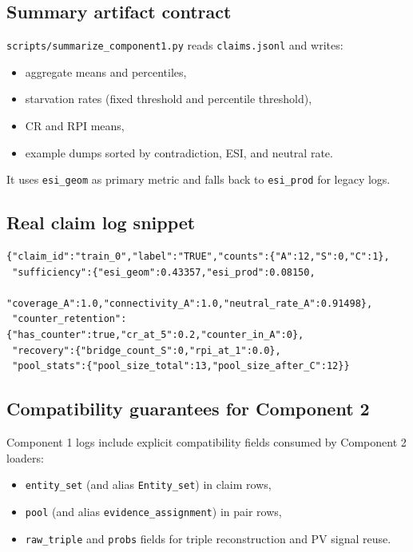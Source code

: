 \subsection{Summary artifact contract}
\texttt{scripts/summarize\_component1.py} reads \texttt{claims.jsonl} and writes:
\begin{itemize}
\item aggregate means and percentiles,
\item starvation rates (fixed threshold and percentile threshold),
\item CR and RPI means,
\item example dumps sorted by contradiction, ESI, and neutral rate.
\end{itemize}
It uses \texttt{esi\_geom} as primary metric and falls back to \texttt{esi\_prod} for legacy logs.

\subsection{Real claim log snippet}
\begin{lstlisting}[style=jsonstyle,caption={Abbreviated real row from train claims.jsonl}]
{"claim_id":"train_0","label":"TRUE","counts":{"A":12,"S":0,"C":1},
 "sufficiency":{"esi_geom":0.43357,"esi_prod":0.08150,
                 "coverage_A":1.0,"connectivity_A":1.0,"neutral_rate_A":0.91498},
 "counter_retention":{"has_counter":true,"cr_at_5":0.2,"counter_in_A":0},
 "recovery":{"bridge_count_S":0,"rpi_at_1":0.0},
 "pool_stats":{"pool_size_total":13,"pool_size_after_C":12}}
\end{lstlisting}

\subsection{Compatibility guarantees for Component 2}
Component 1 logs include explicit compatibility fields consumed by Component 2 loaders:
\begin{itemize}
\item \texttt{entity\_set} (and alias \texttt{Entity\_set}) in claim rows,
\item \texttt{pool} (and alias \texttt{evidence\_assignment}) in pair rows,
\item \texttt{raw\_triple} and \texttt{probs} fields for triple reconstruction and PV signal reuse.
\end{itemize}
